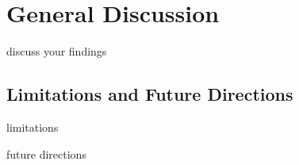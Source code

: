 \section{General Discussion}

discuss your findings

\subsection*{Limitations and Future Directions}

limitations

future directions